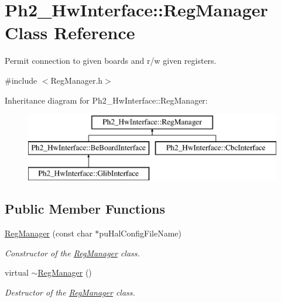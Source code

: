 \hypertarget{class_ph2___hw_interface_1_1_reg_manager}{\section{Ph2\-\_\-\-Hw\-Interface\-:\-:Reg\-Manager Class Reference}
\label{class_ph2___hw_interface_1_1_reg_manager}
}


Permit connection to given boards and r/w given registers.  




{\ttfamily \#include $<$Reg\-Manager.\-h$>$}

Inheritance diagram for Ph2\-\_\-\-Hw\-Interface\-:\-:Reg\-Manager\-:\begin{figure}[H]
\begin{center}
\leavevmode
\includegraphics[height=3.000000cm]{class_ph2___hw_interface_1_1_reg_manager}
\end{center}
\end{figure}
\subsection*{Public Member Functions}
\begin{DoxyCompactItemize}
\item 
\hyperlink{class_ph2___hw_interface_1_1_reg_manager_a938f6b582b1fffcb478f35fd9d81954f}{Reg\-Manager} (const char $\ast$pu\-Hal\-Config\-File\-Name)
\begin{DoxyCompactList}\small\item\em Constructor of the \hyperlink{class_ph2___hw_interface_1_1_reg_manager}{Reg\-Manager} class. \end{DoxyCompactList}\item 
virtual \hyperlink{class_ph2___hw_interface_1_1_reg_manager_a5d650c4e6467153f98f999abbbfc354c}{$\sim$\-Reg\-Manager} ()
\begin{DoxyCompactList}\small\item\em Destructor of the \hyperlink{class_ph2___hw_interface_1_1_reg_manager}{Reg\-Manager} class. \end{DoxyCompactList}\end{DoxyCompactItemize}
